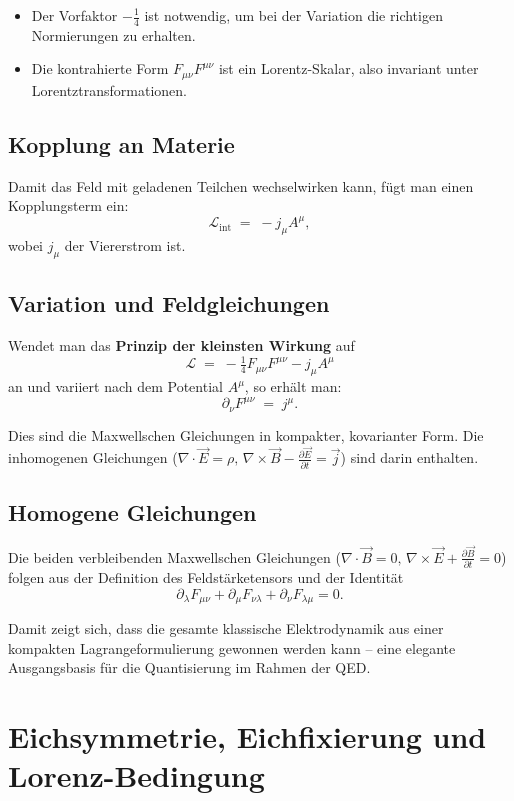\begin{itemize}
	\item Der Vorfaktor \(-\tfrac{1}{4}\) ist notwendig, um bei der Variation 
	die richtigen Normierungen zu erhalten.
	\item Die kontrahierte Form \(F_{\mu\nu} F^{\mu\nu}\) 
	ist ein Lorentz-Skalar, also invariant unter Lorentztransformationen.
\end{itemize}

\subsection*{Kopplung an Materie}
Damit das Feld mit geladenen Teilchen wechselwirken kann,
fügt man einen Kopplungsterm ein:
\[
\mathcal{L}_{\text{int}} \;=\; - j_\mu A^\mu ,
\]
wobei \( j_\mu \) der Viererstrom ist.

\subsection*{Variation und Feldgleichungen}
Wendet man das \textbf{Prinzip der kleinsten Wirkung} auf
\[
\mathcal{L} \;=\; -\tfrac{1}{4} F_{\mu\nu}F^{\mu\nu} - j_\mu A^\mu
\]
an und variiert nach dem Potential \( A^\mu \), so erhält man:
\[
\partial_\nu F^{\mu\nu} \;=\; j^\mu .
\]

Dies sind die Maxwellschen Gleichungen in kompakter, 
kovarianter Form. Die inhomogenen Gleichungen
(\( \nabla \cdot \vec{E} = \rho, \, \nabla \times \vec{B} - \tfrac{\partial \vec{E}}{\partial t} = \vec{j} \))
sind darin enthalten.

\subsection*{Homogene Gleichungen}
Die beiden verbleibenden Maxwellschen Gleichungen 
(\( \nabla \cdot \vec{B} = 0, \, \nabla \times \vec{E} + \tfrac{\partial \vec{B}}{\partial t} = 0 \))
folgen aus der Definition des Feldstärketensors
und der Identität
\[
\partial_\lambda F_{\mu\nu} + \partial_\mu F_{\nu\lambda} + \partial_\nu F_{\lambda\mu} = 0 .
\]

\medskip
Damit zeigt sich, dass die gesamte klassische Elektrodynamik 
aus einer kompakten Lagrangeformulierung gewonnen werden kann – 
eine elegante Ausgangsbasis für die Quantisierung im Rahmen der QED.
\section{Eichsymmetrie, Eichfixierung und \newline Lorenz-Bedingung}
\label{anhangA:eichsymmetrie}

